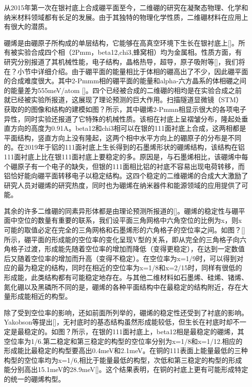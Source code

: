 \documentclass[phd,nobackinfo]{scutthesis}
\begin{document}
从2015年第一次在银衬底上合成硼平面至今，二维硼的研究在凝聚态物理、化学和纳米材料领域都有长足的发展。由于其独特的物理化学性质，二维硼材料在应用上有很大的潜质。

硼烯是由硼原子所构成的单层结构，它能够在高真空环境下生长在银衬底上[]。所有被实验合成四个相（2Pmm，beta12,chi3,蜂窝相）均为金属相。性质方面，有研究分别报道了其机械性能，电子结构，晶格热导，超导，原子吸附等[]，我们将在？小节中详细介绍。由于硼平面的能量相比于体相的硼高出了不少，因此硼平面的合成难度很大。其中2-Pmmm相的硼平面的能量和alpha-六方晶系的体相硼之间的能量差为555meV/atom []。四个已经被合成的二维硼的相均是在实验合成之前就已经被实验所报道，这展现了理论预测的巨大作用。扫描隧道显微镜（STM）获取的的图像和结构的建模如图？所示，其中硼烯2-Pmmn相显示很大的各项电子异性，同时实验还报道了它特殊的机械性质。该相在衬底上呈褶皱分布，隆起处垂直方向的高度为0.91A。beta12和chi3相可以在银的111面衬底上合成，这两相都是平面结构，竖直方向上没有隆起，这两个相中水平方向上的硼原子的分布是不同的。在2019年于铝的111面衬底上生长得到的石墨烯形状的硼烯结构，该结构在铝111面衬底上比在银111面衬底上要稳定的多。原因是，与石墨烯相比，该硼烯中每个硼原子有一个电子的缺失，但银的111面相比铝的衬底不容易出现电荷转移，而铝恰好能向硼平面转移电子以稳定结构。这四个稳定的二维硼烯的合成大大激励了研究人员对硼烯的研究热度，同时也为硼烯在纳米器件和能源领域的应用提供了可能。

其余的许多二维硼的同素异形体都是由理论预测所报道的[]。硼烯的稳定性与硼平面中空位的数量有重要的联系，我们设平面三角网格中六角空位的比例为x，则x可能的取值必定在完全的三角网格和石墨烯形的六角格子的空位率之间。如图？[]所示，硼平面的形成能的空位率的变化呈现V型的关系，即从完全的三角格子向六角格子过渡，形成能先随着空位率的增加而降低（变得更稳定），在达到一定数值后又随着空位率的增加而升高（变得不稳定）。在空位率为x=1/9时，可以得到对应的最为稳定的结构，同时在相近的空位率为x=1/8和x=2/15时，同样有很低的形成能，此类结构都有可能稳定地存在。与其他二维材料如石墨烯、硅烯、锗烯、氮化硼以及黑磷所不同的是，硼烯的各种平面结构中在最稳定的结构附近，存在大量形成能相近的构型。

除了受到空位率的影响，还如前面所列举的，硼烯的稳定性还受到了衬底的影响。Yakobson等提出[]，无衬底时的基态结构虽然形成能较低，但生长在衬底时却不一定是最稳定的。如图？所示，在银的111面衬底上，beta12相是最稳定的硼烯，其空位率为1/6.第二稳定和第三稳定的构型的空位率分别为x=1/8和x=1/12.相应的形成能比最稳定的构型要高出0.4meV和2.1meV。在铜的111表面上能量最低的三种构型的空位率均为x=1/6,相比于能量最低的构型，次低和第三稳定的构型的形成能分别高出15.1meV的28.9meV[]。这个结果表明，在铜的衬底上更有可能形成特定的统一的硼烯构型。
\end{document}
